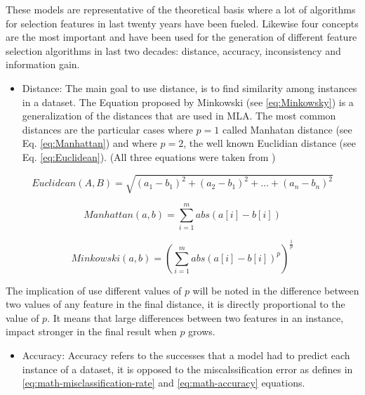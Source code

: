 \documentclass[]{book}
\providecommand{\tightlist}{%
  \setlength{\itemsep}{0pt}\setlength{\parskip}{0pt}}
\begin{document}
These models are representative of the theoretical basis where a lot of
algorithms for selection features in last twenty years have been fueled.
Likewise four concepts are the most important and have been used for the
generation of different feature selection algorithms in last two
decades: distance, accuracy, inconsistency and information gain.

\begin{itemize}
\tightlist
\item
  Distance: The main goal to use distance, is to find similarity among
  instances in a dataset. The Equation proposed by Minkowski (see
  \eqref{eq:Minkowsky}) is a generalization of the distances that are used
  in MLA. The most common distances are the particular cases where
  \(p=1\) called Manhatan distance (see Eq. \eqref{eq:Manhattan}) and
  where \(p=2\), the well known Euclidian distance (see Eq.
  \eqref{eq:Euclidean}). (All three equations were taken from
  \citep{Kelleher})
\end{itemize}

\begin{equation}
      Euclidean(A,B)=\sqrt{(a_1-b_1)^2+(a_2-b_1)^2+\dots+(a_n-b_n)^2}
      \label{eq:Euclidean}
\end{equation}

\begin{equation}
      Manhattan(a,b)=\sum_{i=1}^{m}abs(a[i]-b[i])
      \label{eq:Manhattan}
\end{equation}

\begin{equation}
    Minkowski(a,b)=\left({\sum_{i=1}^{m}abs(a[i]-b[i])^p}\right)^{\frac{1}{p}}
    \label{eq:Minkowski}
\end{equation}

The implication of use different values of \(p\) will be noted in the
difference between two values of any feature in the final distance, it
is directly proportional to the value of \(p\). It means that large
differences between two features in an instance, impact stronger in the
final result when \(p\) grows.

\begin{itemize}
\tightlist
\item
  Accuracy: Accuracy refers to the successes that a model had to predict
  each instance of a dataset, it is opposed to the miscalssification
  error as \citep{Kelleher2015} defines in
  \eqref{eq:math-misclassification-rate} and \eqref{eq:math-accuracy}
  equations.
\end{itemize}
\end{document}
